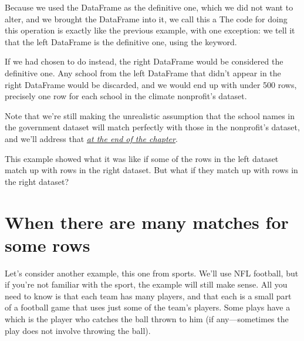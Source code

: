 \documentclass[letterpaper,10pt,english]{jupyterBook}
\begin{document}
\sphinxAtStartPar
Because we used the  DataFrame as the definitive one, which we did not want to alter, and we brought the  DataFrame into it, we call this a   The code for doing this operation is exactly like the previous  example, with one exception: we tell it that the left DataFrame is the definitive one, using the  keyword.

\begin{sphinxVerbatim}[commandchars=\\\{\}]
    
       
\end{sphinxVerbatim}

\sphinxAtStartPar
If we had chosen to do  instead, the right DataFrame would be considered the definitive one.  Any school from the left DataFrame that didn’t appear in the right DataFrame would be discarded, and we would end up with under 500 rows, precisely one row for each school in the climate nonprofit’s dataset.

\sphinxAtStartPar
Note that we’re still making the unrealistic assumption that the school names in the government dataset will match perfectly with those in the nonprofit’s dataset, and we’ll address that {\hyperref[\detokenize{chapter-12-concat-and-merge:ensuring-a-unique-id-appears-in-both-datasets}]{\emph{at the end of the chapter}}}.

\sphinxAtStartPar
This example showed what it was like if some of the rows in the left dataset match up with  rows in the right dataset.  But what if they match up with  rows in the right dataset?


\section{When there are many matches for some rows}
\label{\detokenize{chapter-12-concat-and-merge:when-there-are-many-matches-for-some-rows}}
\sphinxAtStartPar
Let’s consider another example, this one from sports.  We’ll use NFL football, but if you’re not familiar with the sport, the example will still make sense.  All you need to know is that each team has many players, and that each  is a small part of a football game that uses just some of the team’s players.  Some plays have a  which is the player who catches the ball thrown to him (if any—sometimes the play does not involve throwing the ball).
\end{document}
